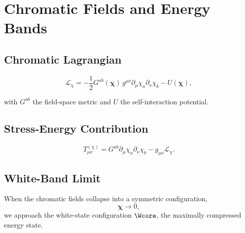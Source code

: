 \chapter{Chromatic Fields and Energy Bands}

\section{Chromatic Lagrangian}

\[
\mathcal{L}_\chi
=
-\frac{1}{2}G^{ab}(\bm{\chi})\, g^{\mu\nu}\partial_\mu\chi_a\partial_\nu\chi_b
- U(\bm{\chi}),
\]

with $G^{ab}$ the field-space metric and $U$ the self-interaction potential.

\section{Stress-Energy Contribution}

\[
T^{(\chi)}_{\mu\nu}
=
G^{ab}\partial_\mu\chi_a\partial_\nu\chi_b
- g_{\mu\nu}\mathcal{L}_\chi.
\]

\section{White-Band Limit}

When the chromatic fields collapse into a symmetric configuration,
\[
\bm{\chi} \to 0,
\]
we approach the white-state configuration $\Wcore$, the maximally compressed energy state.
